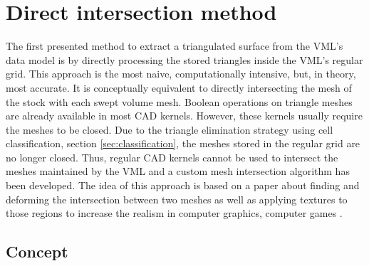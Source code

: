 
\chapter{Direct intersection method}
\label{ch:direct_intersection}

The first presented method to extract a triangulated surface from the VML's data model is by directly processing the stored triangles inside the VML's regular grid.
This approach is the most naive, computationally intensive, but, in theory, most accurate.
It is conceptually equivalent to directly intersecting the mesh of the stock with each swept volume mesh.
Boolean operations on triangle meshes are already available in most CAD kernels.
However, these kernels usually require the meshes to be closed.
Due to the triangle elimination strategy using cell classification, \cf section \ref{sec:classification}, the meshes stored in the regular grid are no longer closed.
Thus, regular CAD kernels cannot be used to intersect the meshes maintained by the VML and a custom mesh intersection algorithm has been developed.
The idea of this approach is based on a paper about finding and deforming the intersection between two meshes as well as applying textures to those regions to increase the realism in computer graphics, \ie computer games \cite{mesh_intersection}.

\section{Concept}
\label{sec:direct_intersection_concept}

